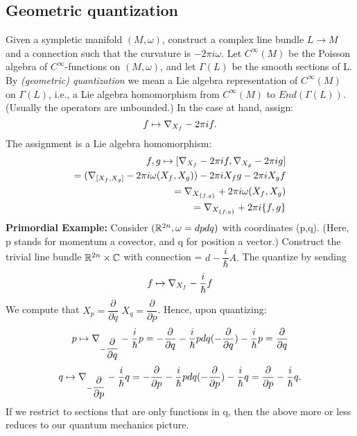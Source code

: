 \subsection{Geometric quantization}
Given a sympletic manifold $(M,\omega)$, construct a complex line bundle $L \rightarrow M$ and a connection \nab such that 
the curvature is $-2 \pi i \omega$. Let $C^{\infty} (M)$ be the Poisson algebra of $C^{\infty}$-functions on $(M, \omega)$,
and let $\Gamma(L)$ be the smooth sections of L. 
\newline By \textit{(geometric) quantization} we mean a Lie algebra representation of $C^{\infty}(M)$ on $\Gamma(L)$,
i.e., a Lie algebra homomorphism from $C^{\infty}(M)$ to $End(\Gamma(L)).$ (Usually the operators are unbounded.)
In the case at hand, assign: 
\begin{equation*}
 f \mapsto \nabla_{X_{f}} - 2\pi i f.
\end{equation*}
The assignment is a Lie algebra homomorphism: 
\begin{eqnarray}
 {f,g} \mapsto [\nabla_{X_{f}} - 2 \pi i f, \nabla_{X_{g}} - 2 \pi i g ] \\
  = (\nabla_{[X_f,X_g]} - 2 \pi i \omega (X_f, X_g)) - 2 \pi i X_{f} g - 2 \pi i X_{g} f
 \\ = \nabla_{X_{\lbrace f,g \rbrace}} + 2 \pi i \omega (X_f, X_g)
 \\ = \nabla_{X_{\lbrace f,g \rbrace}} + 2 \pi i \lbrace f,g \rbrace
\end{eqnarray}
\textbf{Primordial Example:} Consider $(\mathbb{R}^{2n}, \omega = dpdq)$ with coordinates (p,q). (Here, p stands for momentum a covector, 
and q for position a vector.) Construct the trivial line bundle $\mathbb{R}^{2n} \times \mathbb{C}$ with connection \nab = $d - \dfrac{i}{\hbar}A.$
The quantize by sending
\begin{equation*}
 f \mapsto \nabla_{X_{f}} - \dfrac{i}{\hbar}f
\end{equation*}
We compute that $X_p = \dfrac{\partial}{\partial q}$ $X_q = \dfrac{\partial}{\partial p}$.
Hence, upon quantizing:
\begin{equation*}
 p \mapsto \nabla_{-\dfrac{\partial}{\partial q}} - \dfrac{i}{\hbar} p = - \dfrac{\partial}{\partial q} - \dfrac{i}{\hbar}
 pdq (- \dfrac{\partial}{\partial q}) - \dfrac{i}{\hbar} p = \dfrac{\partial}{\partial q}
\end{equation*}
\begin{equation*}
 q \mapsto \nabla_{-\dfrac{\partial}{\partial p}} - \dfrac{i}{\hbar} q = - \dfrac{\partial}{\partial p} - \dfrac{i}{\hbar}
 pdq (- \dfrac{\partial}{\partial p}) - \dfrac{i}{\hbar} q = \dfrac{\partial}{\partial p} - \dfrac{i}{\hbar} q.
\end{equation*}
If we restrict to sections that are only functions in q, then the above more or less reduces to our quantum mechanics picture.
